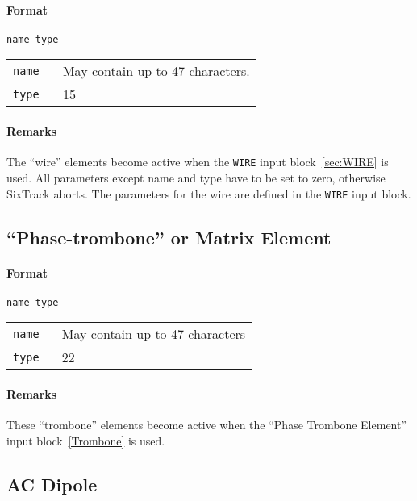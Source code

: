 \paragraph{Format} \texttt{name type}

\bigskip
\begin{tabular}{@{}lp{0.8\linewidth}}
    \texttt{name} & May contain up to 47 characters. \\
    \texttt{type} & 15
\end{tabular}

\paragraph{Remarks}
The ``wire'' elements become active when the \texttt{WIRE} input block~\ref{sec:WIRE} is used.
All parameters except name and type have to be set to zero, otherwise SixTrack aborts.
The parameters for the wire are defined in the \texttt{WIRE} input block.

\subsection{``Phase-trombone'' or Matrix Element} \label{PT}

\paragraph{Format} \texttt{name type}

\bigskip
\begin{tabular}{@{}lp{0.8\linewidth}}
    \texttt{name} & May contain up to 47 characters \\
    \texttt{type} & 22
\end{tabular}

\paragraph{Remarks}
These ``trombone'' elements become active when the ``Phase Trombone Element'' input block~\ref{Trombone} is used.

\subsection{AC Dipole} \label{ACDIP}

